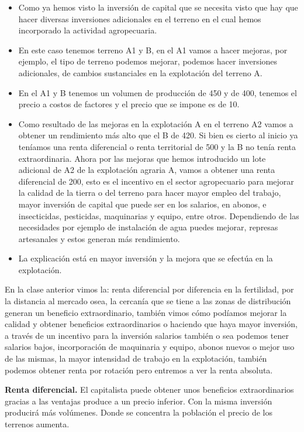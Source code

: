 \documentclass[
  letterpaper,
  DIV=11,
  numbers=noendperiod]{scrartcl}
\begin{document}
\begin{itemize}
\item
  Como ya hemos visto la inversión de capital que se necesita visto que
  hay que hacer diversas inversiones adicionales en el terreno en el
  cual hemos incorporado la actividad agropecuaria.
\item
  En este caso tenemos terreno A1 y B, en el A1 vamos a hacer mejoras,
  por ejemplo, el tipo de terreno podemos mejorar, podemos hacer
  inversiones adicionales, de cambios sustanciales en la explotación del
  terreno A.
\item
  En el A1 y B tenemos un volumen de producción de 450 y de 400, tenemos
  el precio a costos de factores y el precio que se impone es de 10.
\item
  Como resultado de las mejoras en la explotación A en el terreno A2
  vamos a obtener un rendimiento más alto que el B de 420. Si bien es
  cierto al inicio ya teníamos una renta diferencial o renta territorial
  de 500 y la B no tenía renta extraordinaria. Ahora por las mejoras que
  hemos introducido un lote adicional de A2 de la explotación agraria A,
  vamos a obtener una renta diferencial de 200, esto es el incentivo en
  el sector agropecuario para mejorar la calidad de la tierra o del
  terreno para hacer mayor empleo del trabajo, mayor inversión de
  capital que puede ser en los salarios, en abonos, e insecticidas,
  pesticidas, maquinarias y equipo, entre otros. Dependiendo de las
  necesidades por ejemplo de instalación de agua puedes mejorar,
  represas artesanales y estos generan más rendimiento.
\item
  La explicación está en mayor inversión y la mejora que se efectúa en
  la explotación.
\end{itemize}

En la clase anterior vimos la: renta diferencial por diferencia en la
fertilidad, por la distancia al mercado osea, la cercanía que se tiene a
las zonas de distribución generan un beneficio extraordinario, también
vimos cómo podíamos mejorar la calidad y obtener beneficios
extraordinarios o haciendo que haya mayor inversión, a través de un
incentivo para la inversión salarios también o sea podemos tener
salarios bajos, incorporación de maquinaria y equipo, abonos nuevos o
mejor uso de las mismas, la mayor intensidad de trabajo en la
explotación, también podemos obtener renta por rotación pero entremos a
ver la renta absoluta.

\textbf{Renta diferencial.} El capitalista puede obtener unos beneficios
extraordinarios gracias a las ventajas produce a un precio inferior. Con
la misma inversión producirá más volúmenes. Donde se concentra la
población el precio de los terrenos aumenta.
\end{document}
